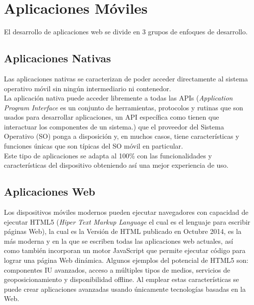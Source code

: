 \chapter{Aplicaciones Móviles}
\label{cha:aplicaciones_moviles}

  El desarrollo de aplicaciones web se divide en 3 grupos de enfoques de desarrollo.\\

  \section{Aplicaciones Nativas}
  \label{sec:aplicaciones_nativas}

  Las aplicaciones nativas se caracterizan de poder acceder directamente al sistema operativo móvil sin ningún intermediario ni contenedor.\\

  La aplicación nativa puede acceder libremente a todas las APIs (\emph{Application Program Interface} es un conjunto de herramientas, protocolos y rutinas que son usados para desarrollar aplicaciones, un API específica como tienen que interactuar los componentes de un sistema.) que el proveedor del Sistema Operativo (SO) ponga a disposición y, en muchos casos, tiene características y funciones únicas que son típicas del SO móvil en particular.\\

  Este tipo de aplicaciones se adapta al 100\% con las funcionalidades y características del dispositivo obteniendo así una mejor experiencia de uso.\\


  \section{Aplicaciones Web}
  \label{sec:aplicaciones_web}

  Los dispositivos móviles modernos pueden ejecutar navegadores con capacidad de ejecutar HTML5 (\emph{Hiper Text Markup Language} el cual es el lenguaje para escribir páginas Web), la cual es la Versión de HTML publicado en Octubre 2014, es la más moderna y en la que se escriben todas las aplicaciones web actuales, así como también incorporan un motor JavaScript que permite ejecutar código para lograr una página Web dinámica. Algunos ejemplos del potencial de HTML5 son: componentes IU avanzados, acceso a múltiples tipos de medios, servicios de geoposicionamiento y disponibilidad offline. Al emplear estas características se puede crear aplicaciones avanzadas usando únicamente tecnologías basadas en la Web.\\

